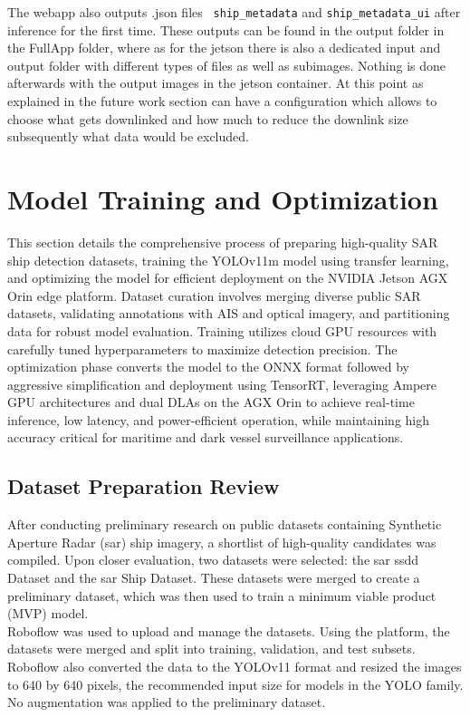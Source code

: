\documentclass{article}
\begin{document}
	The webapp also outputs .json files \texttt{ ship\_metadata} and \texttt{ship\_metadata\_ui} after inference for the first time.
	These outputs can be found in the output folder in the FullApp folder, where as for the jetson there is also a dedicated input and output folder with different types of files as well as subimages. Nothing is done afterwards with the output images in the jetson container. At this point as explained in the future work section can have a configuration which allows to choose what gets downlinked and how much to reduce the downlink size subsequently what data would be excluded.
	
	
	\newpage
	
	
	\section{Model Training and Optimization}
	This section details the comprehensive process of preparing high-quality SAR ship detection datasets, training the YOLOv11m model using transfer learning, and optimizing the model for efficient deployment on the NVIDIA Jetson AGX Orin edge platform. Dataset curation involves merging diverse public SAR datasets, validating annotations with AIS and optical imagery, and partitioning data for robust model evaluation. Training utilizes cloud GPU resources with carefully tuned hyperparameters to maximize detection precision. The optimization phase converts the model to the ONNX format followed by aggressive simplification and deployment using TensorRT, leveraging Ampere GPU architectures and dual DLAs on the AGX Orin to achieve real-time inference, low latency, and power-efficient operation, while maintaining high accuracy critical for maritime and dark vessel surveillance applications.
	
	\subsection{Dataset Preparation Review}
	After conducting preliminary research on public datasets containing Synthetic Aperture Radar (\acrshort{sar}) ship imagery, a shortlist of high-quality candidates was compiled. Upon closer evaluation, two datasets were selected: the \acrshort{sar} \acrshort{ssdd} Dataset and the \acrshort{sar} Ship Dataset. These datasets were merged to create a preliminary dataset, which was then used to train a minimum viable product (MVP) model.\\
	
	Roboflow was used to upload and manage the datasets. Using the platform, the datasets were merged and split into training, validation, and test subsets. Roboflow also converted the data to the YOLOv11 format and resized the images to 640 by 640 pixels, the recommended input size for models in the YOLO family. No augmentation was applied to the preliminary dataset.
	
\end{document}
